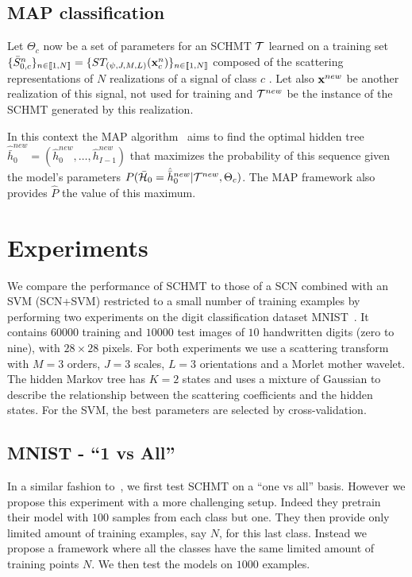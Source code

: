 \documentclass{article}
\begin{document}
  \vspace{-5pt}
	\subsection{MAP classification}
    \label{subsec:SCN/MAP}
    \vspace{-5pt}
    Let $\Theta_{c}$ now be a set of parameters for an SCHMT $\mathcal{T}$ learned on a training set $\{\bar{S}_{0,c}^n\}_{n \in \llbracket1, N \rrbracket} = \{ST_{(\psi, J, M, L)}({\bf x}_{c}^{n})\}_{n \in \llbracket1, N \rrbracket}$ composed of the scattering representations of $N$ realizations of a signal of class $c$ . Let also ${\bf x}^{new}$ be another realization of this signal, not used for training and $\mathcal{T}^{new}$ be the instance of the SCHMT generated by this realization.

    In this context the MAP algorithm~\cite{durand2001statistical} aims to find the optimal hidden tree $\hat{\bar{h}}_{0}^{new}=(\hat{h}_{0}^{new}, \ldots , \hat{h}_{I-1}^{new})$ that maximizes the probability of this sequence given the model's parameters $P(\bar{\mathcal{H}}_{0}= \hat{\bar{h}}_{0}^{new}|\mathcal{T}^{new},\Theta_{c})$. The MAP framework also provides $\hat{P}$ the value of this maximum.
    
\section{Experiments}
  \label{sec:Exps}
  \vspace{-5pt}
  We compare the performance of SCHMT to those of a SCN combined with an SVM (SCN+SVM) restricted to a small number of training examples by performing two experiments on the digit classification dataset MNIST~\cite{lecun2016web}. It contains $60000$ training and $10000$ test images of $10$ handwritten digits (zero to nine), with $28\times28$ pixels.
  For both experiments we use a scattering transform with $M=3$ orders, $J=3$ scales, $L=3$ orientations and a Morlet mother wavelet. The hidden Markov tree has $K=2$ states and uses a mixture of Gaussian to describe the relationship between the scattering coefficients and the hidden states. For the SVM, the best parameters are selected by cross-validation.
  
  \vspace{-5pt}
  \subsection{MNIST - ``1 vs All''}
		\label{subsec:Exps/MNIST - 1vsAll}
		\vspace{-5pt}
		In a similar fashion to~\cite{salakhutdinov2010one}, we first test SCHMT on a ``one vs all'' basis. However we propose this experiment with a more challenging setup. Indeed they pretrain their model with $100$ samples from each class but one. They then provide only limited amount of training examples, say $N$, for this last class. Instead we propose a framework where all the classes have the same limited amount of training points $N$. We then test the models on $1000$ examples.
		
\end{document}
